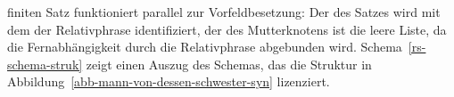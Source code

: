 finiten Satz funktioniert parallel zur Vorfeldbesetzung: Der \slashw des Satzes wird mit dem \localw
der Relativphrase identifiziert, der \slashw des Mutterknotens ist die leere Liste, da die Fernabhängigkeit
durch die Relativphrase abgebunden wird. Schema~\vref{rs-schema-struk} zeigt einen Auszug des Schemas, das die Struktur in 
Abbildung~\ref{abb-mann-von-dessen-schwester-syn} lizenziert.
\begin{samepage}
\begin{schema}
\label{rs-schema-struk}
 \impl\\
\end{schema}
\end{samepage}
